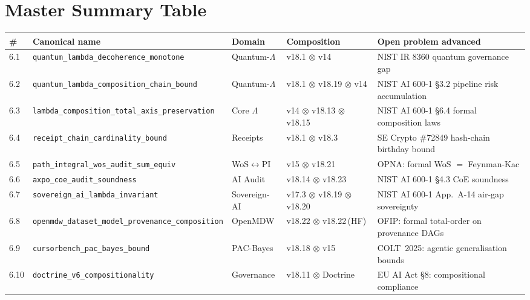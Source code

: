 \section{Master Summary Table}
\label{sec:summary-ch06}

\begin{table}[ht]
\centering
\footnotesize
\begin{tabular}{lllll}
\hline
\# & Canonical name & Domain & Composition & Open problem advanced \\
\hline
6.1  & \texttt{quantum\_lambda\_decoherence\_monotone}
     & Quantum-$\Lambda$ & v18.1 $\otimes$ v14
     & NIST IR 8360 quantum governance gap \\
6.2  & \texttt{quantum\_lambda\_composition\_chain\_bound}
     & Quantum-$\Lambda$ & v18.1 $\otimes$ v18.19 $\otimes$ v14
     & NIST AI 600-1 \S{}3.2 pipeline risk accumulation \\
6.3  & \texttt{lambda\_composition\_total\_axis\_preservation}
     & Core \(\Lambda\) & v14 $\otimes$ v18.13 $\otimes$ v18.15
     & NIST AI 600-1 \S{}6.4 formal composition laws \\
6.4  & \texttt{receipt\_chain\_cardinality\_bound}
     & Receipts & v18.1 $\otimes$ v18.3
     & SE Crypto \#72849 hash-chain birthday bound \\
6.5  & \texttt{path\_integral\_wos\_audit\_sum\_equiv}
     & WoS$\leftrightarrow$PI & v15 $\otimes$ v18.21
     & OPNA: formal WoS $=$ Feynman-Kac \\
6.6  & \texttt{axpo\_coe\_audit\_soundness}
     & AI Audit & v18.14 $\otimes$ v18.23
     & NIST AI 600-1 \S{}4.3 CoE soundness \\
6.7  & \texttt{sovereign\_ai\_lambda\_invariant}
     & Sovereign-AI & v17.3 $\otimes$ v18.19 $\otimes$ v18.20
     & NIST AI 600-1 App.~A-14 air-gap sovereignty \\
6.8  & \texttt{openmdw\_dataset\_model\_provenance\_composition}
     & OpenMDW & v18.22 $\otimes$ v18.22\,(HF)
     & OFIP: formal total-order on provenance DAGs \\
6.9  & \texttt{cursorbench\_pac\_bayes\_bound}
     & PAC-Bayes & v18.18 $\otimes$ v15
     & COLT~2025: agentic generalisation bounds \\
6.10 & \texttt{doctrine\_v6\_compositionality}
     & Governance & v18.11 $\otimes$ Doctrine
     & EU AI Act \S{}8: compositional compliance \\

\end{tabular}
\end{table}
